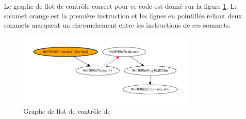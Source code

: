 Le graphe de flot de contrôle correct pour ce code est donné sur la figure \ref{fig:telock_cfg}. Le sommet orange est la première instruction et les lignes en pointillés reliant deux sommets marquent un chevauchement entre les instructions de ces sommets.

\begin{figure}
\begin{center}
\includegraphics[width=0.8\textwidth]{supports/disasm/telock/telock.pdf}
\end{center}
\caption{Graphe de flot de contrôle de \telock}
\label{fig:telock_cfg}
\end{figure}

% 

